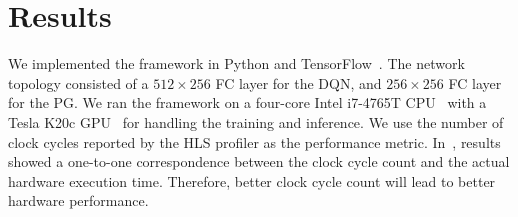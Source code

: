 \section{Results} %
\label{sec:results}
% 
\vspace{-0.1cm}
We implemented the framework in Python and TensorFlow~\cite{TF}. The network topology consisted of a $512\times256$ FC layer for the DQN, and $256\times256$ FC layer for the PG. We ran the framework on a four-core Intel i7-4765T CPU~\cite{Intel2017} with a Tesla K20c GPU~\cite{Nvidia2012} for handling the training and inference.
We use the number of clock cycles reported by the HLS profiler as the performance metric. 
In~\cite{huang2013effect}, results showed a one-to-one correspondence between the clock cycle count and the actual hardware execution time. Therefore, better clock cycle count will lead to better hardware performance. 

